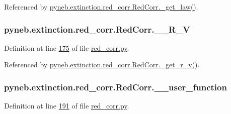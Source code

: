 \begin{DoxyVerb}
Referenced by \hyperlink{red__corr_8py_source_l00150}{pyneb.\+extinction.\+red\+\_\+corr.\+Red\+Corr.\+\_\+get\+\_\+law()}.

\hypertarget{classpyneb_1_1extinction_1_1red__corr_1_1_red_corr_a93f7e44201375bc6e05a20c092b6a1d6}{}
\subsubsection[{\+\_\+\+\_\+\+R\+\_\+\+V}]{\setlength{\rightskip}{0pt plus 5cm}pyneb.\+extinction.\+red\+\_\+corr.\+Red\+Corr.\+\_\+\+\_\+\+R\+\_\+\+V\hspace{0.3cm}{\ttfamily [private]}}\label{classpyneb_1_1extinction_1_1red__corr_1_1_red_corr_a93f7e44201375bc6e05a20c092b6a1d6}


Definition at line \hyperlink{red__corr_8py_source_l00175}{175} of file \hyperlink{red__corr_8py_source}{red\+\_\+corr.\+py}.



Referenced by \hyperlink{red__corr_8py_source_l00148}{pyneb.\+extinction.\+red\+\_\+corr.\+Red\+Corr.\+\_\+get\+\_\+r\+\_\+v()}.

\hypertarget{classpyneb_1_1extinction_1_1red__corr_1_1_red_corr_aaf6e0eb6732be82bc65b02c36a2429c2}{}
\subsubsection[{\+\_\+\+\_\+user\+\_\+function}]{\setlength{\rightskip}{0pt plus 5cm}pyneb.\+extinction.\+red\+\_\+corr.\+Red\+Corr.\+\_\+\+\_\+user\+\_\+function\hspace{0.3cm}{\ttfamily [private]}}\label{classpyneb_1_1extinction_1_1red__corr_1_1_red_corr_aaf6e0eb6732be82bc65b02c36a2429c2}


Definition at line \hyperlink{red__corr_8py_source_l00191}{191} of file \hyperlink{red__corr_8py_source}{red\+\_\+corr.\+py}.




\end{DoxyVerb}
